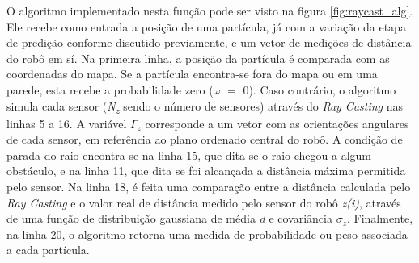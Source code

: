 \documentclass[
	12pt,				%
	openright,			%
	oneside,			%
	a4paper,			%
	english,			%
	french,				%
	spanish,			%
	brazil,				%
	]{abntex2}
\begin{document}
O algoritmo implementado nesta função pode ser visto na figura \ref{fig:raycast_alg}. Ele recebe como entrada a posição de uma partícula, já com a variação da etapa de predição conforme discutido previamente, e um vetor de medições de distância do robô em sí. Na primeira linha, a posição da partícula é comparada com as coordenadas do mapa. Se a partícula encontra-se fora do mapa ou em uma parede, esta recebe a probabilidade zero ($\omega\,\,=\,\,0$). Caso contrário, o algoritmo simula cada sensor (\emph{N\textsubscript{z}} sendo o número de sensores) através do \emph{Ray Casting} nas linhas 5 a 16. A variável $\Gamma_z$ corresponde a um vetor com as orientações angulares de cada sensor, em referência ao plano ordenado central do robô. A condição de parada do raio encontra-se na linha 15, que dita se o raio chegou a algum obstáculo, e na linha 11, que dita se foi alcançada a distância máxima permitida pelo sensor. Na linha 18, é feita uma comparação entre a distância calculada pelo \emph{Ray Casting} e o valor real de distância medido pelo sensor do robô \emph{z(i)}, através de uma função de distribuição gaussiana de média \emph{d} e covariância \emph{$\sigma_z$}. Finalmente, na linha 20, o algoritmo retorna uma medida de probabilidade ou peso associada a cada partícula.
\end{document}
